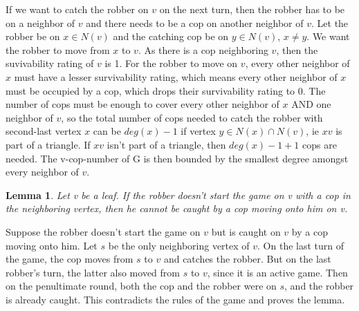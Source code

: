 \documentclass{article}
\newtheorem{lemma}[theorem]{Lemma}
\newenvironment{proof}[1][Proof]{\begin{trivlist}
\item[\hskip \labelsep {\bfseries #1}]}{\end{trivlist}}
\begin{document}
\begin{proof}
If we want to catch the robber on $v$ on the next turn, then the robber has to be on a neighbor of $v$ and there needs to be a cop on another neighbor of $v$. Let the robber be on $x \in N(v)$ and the catching cop be on $y \in N(v)$, $x \ne y$. We want the robber to move from $x$ to $v$. As there is a cop neighboring $v$, then the suvivability rating of $v$ is 1. For the robber to move on $v$, every other neighbor of $x$ must have a lesser survivability rating, which means every other neighbor of $x$ must be occupied by a cop, which drops their survivability rating to 0. The number of cops must be enough to cover every other neighbor of $x$ AND one neighbor of $v$, so the total number of cops needed to catch the robber with second-last vertex $x$ can be $deg(x)-1$ if vertex $y \in N(x) \cap N(v)$, ie $xv$ is part of a triangle. If $xv$ isn't part of a triangle, then $deg(x)-1+1$ cops are needed. The v-cop-number of G is then bounded by the smallest degree amongst every neighbor of $v$. 
\end{proof}

\begin{lemma}
\label{cop-catches}
Let v be a leaf. If the robber doesn't start the game on v with a cop in the neighboring vertex, then he cannot be caught by a cop moving onto him on v.
\end{lemma}
\begin{proof}
Suppose the robber doesn't start the game on $v$ but is caught on $v$ by a cop moving onto him. Let $s$ be the only neighboring vertex of $v$. On the last turn of the game, the cop moves from $s$ to $v$ and catches the robber. But on the last robber's turn, the latter also moved from $s$ to $v$, since it is an active game. Then on the penultimate round, both the cop and the robber were on $s$, and the robber is already caught. This contradicts the rules of the game and proves the lemma.
\end{proof}
\end{document}
